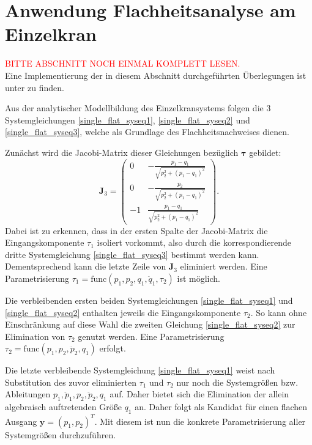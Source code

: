 \section{Anwendung Flachheitsanalyse am Einzelkran}
\textcolor{red}{BITTE ABSCHNITT NOCH EINMAL KOMPLETT LESEN.}\\
Eine Implementierung der in diesem Abschnitt durchgeführten Überlegungen ist unter \cite[flatness\_notebooks/ODE\_flatness\_analysis\_single\_crane.ipynb]{SAGithub} zu finden.

Aus der analytischer Modellbildung des Einzelkransystems folgen die 3 Systemgleichungen \eqref{single_flat_syseq1}, \eqref{single_flat_syseq2} und \eqref{single_flat_syseq3}, welche als Grundlage des Flachheitsnachweises dienen. 

Zunächst wird die Jacobi-Matrix dieser Gleichungen bezüglich $\boldsymbol{\tau}$ gebildet:
\begin{equation}
	\mathbf{J}_3 =
	\left(\begin{matrix}
		0 & - \frac{p_{1} - q_{1}}{\sqrt{p_{2}^{2} + \left(p_{1} - q_{1}\right)^{2}}}\\
		0 & - \frac{p_{2}}{\sqrt{p_{2}^{2} + \left(p_{1} - q_{1}\right)^{2}}}\\
		-1 & \frac{p_{1} - q_{1}}{\sqrt{p_{2}^{2} + \left(p_{1} - q_{1}\right)^{2}}}
	\end{matrix}\right).
\end{equation}
Dabei ist zu erkennen, dass in der ersten Spalte der Jacobi-Matrix die Eingangskomponente $\tau_{1}$ isoliert vorkommt, also durch die korrespondierende dritte Systemgleichung \eqref{single_flat_syseq3} bestimmt werden kann. Dementsprechend kann die letzte Zeile von $\mathbf{J}_3$ eliminiert werden. Eine Parametrisierung $\tau_1 = \mathrm{func}(p_1, p_2, q_1, \ddot{q}_1, \tau_2)$ ist möglich.

Die verbleibenden ersten beiden Systemgleichungen \eqref{single_flat_syseq1} und \eqref{single_flat_syseq2} enthalten jeweils die Eingangskomponente $\tau_2$. So kann ohne Einschränkung auf diese Wahl die zweiten Gleichung \eqref{single_flat_syseq2} zur Elimination von $\tau_2$ genutzt werden. Eine Parametrisierung $\tau_2 = \mathrm{func}(p_1, p_2, \ddot{p}_2, q_1)$ erfolgt.

Die letzte verbleibende Systemgleichung \eqref{single_flat_syseq1} weist nach Substitution des zuvor eliminierten $\tau_1$ und $\tau_2$ nur noch die Systemgrößen bzw. Ableitungen $p_1, \ddot{p}_1, p_2, \ddot{p}_2, q_1$ auf. Daher bietet sich die Elimination der allein algebraisch auftretenden Größe $q_1$ an. Daher folgt als Kandidat für einen flachen Ausgang
$\mathbf{y} = (p_1, p_2)^T$. Mit diesem ist nun die konkrete Parametrisierung aller Systemgrößen durchzuführen.

